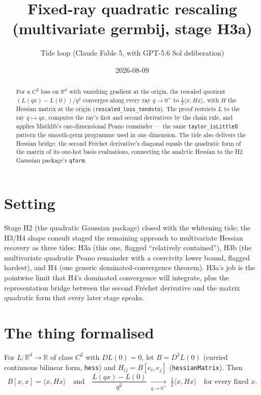 \documentclass[11pt]{article}
\title{Fixed-ray quadratic rescaling\\
(multivariate germbij, stage H3a)}
\author{Tide loop (Claude Fable 5, with GPT-5.6 Sol deliberation)}
\date{2026-08-09}
\begin{document}
\maketitle

\begin{abstract}
\noindent For a $C^2$ loss on $\mathbb{R}^d$ with vanishing gradient
at the origin, the rescaled quotient $(L(qx) - L(0))/q^2$ converges
along every ray $q \to 0^+$ to $\tfrac12\langle x, Hx\rangle$, with
$H$ the Hessian matrix at the origin
(\texttt{rescaled\_loss\_tendsto}). The proof restricts $L$ to the
ray $q \mapsto qx$, computes the ray's first and second derivatives
by the chain rule, and applies Mathlib's one-dimensional Peano
remainder --- the same \texttt{taylor\_isLittleO} pattern the
smooth-germ programme used in one dimension. The tide also delivers
the Hessian bridge: the second Fr\'echet derivative's diagonal equals
the quadratic form of the matrix of its one-hot basis evaluations,
connecting the analytic Hessian to the H2 Gaussian package's
\texttt{qform}.
\end{abstract}

\section{Setting}

Stage H2 (the quadratic Gaussian package) closed with the whitening
tide; the H3/H4 shape consult staged the remaining approach to
multivariate Hessian recovery as three tides: H3a (this one, flagged
``relatively contained''), H3b (the multivariate quadratic Peano
remainder with a coercivity lower bound, flagged hardest), and H4
(one generic dominated-convergence theorem). H3a's job is the
pointwise limit that H4's dominated convergence will integrate, plus
the representation bridge between the second Fr\'echet derivative
and the matrix quadratic form that every later stage speaks.

\section{The thing formalised}

For $L : \mathbb{R}^d \to \mathbb{R}$ of class $C^2$ with
$DL(0) = 0$, let $B = D^2L(0)$ (curried continuous bilinear form,
\texttt{hess}) and $H_{ij} = B[e_i, e_j]$
(\texttt{hessianMatrix}). Then
\[
B[x,x] = \langle x, Hx\rangle
\quad\text{and}\quad
\frac{L(qx) - L(0)}{q^2}
\;\xrightarrow[q \to 0^+]{}\;
\tfrac12 \langle x, Hx\rangle
\quad \text{for every fixed } x.
\]
\end{document}
